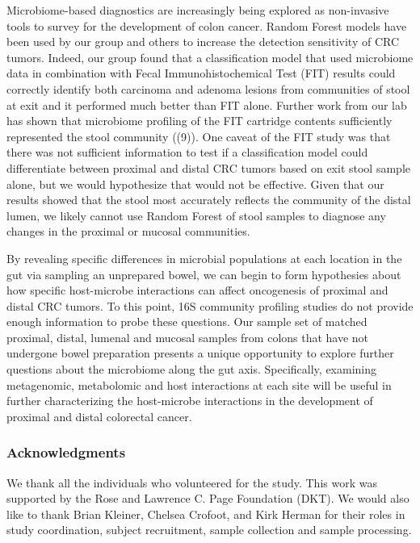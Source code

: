 \documentclass[11pt,]{article}
\begin{document}
Microbiome-based diagnostics are increasingly being explored as
non-invasive tools to survey for the development of colon cancer. Random
Forest models have been used by our group and others to increase the
detection sensitivity of CRC tumors. Indeed, our group found that a
classification model that used microbiome data in combination with Fecal
Immunohistochemical Test (FIT) results could correctly identify both
carcinoma and adenoma lesions from communities of stool at exit and it
performed much better than FIT alone. Further work from our lab has
shown that microbiome profiling of the FIT cartridge contents
sufficiently represented the stool community ((9)). One caveat of the
FIT study was that there was not sufficient information to test if a
classification model could differentiate between proximal and distal CRC
tumors based on exit stool sample alone, but we would hypothesize that
would not be effective. Given that our results showed that the stool
most accurately reflects the community of the distal lumen, we likely
cannot use Random Forest of stool samples to diagnose any changes in the
proximal or mucosal communities.

By revealing specific differences in microbial populations at each
location in the gut via sampling an unprepared bowel, we can begin to
form hypothesies about how specific host-microbe interactions can affect
oncogenesis of proximal and distal CRC tumors. To this point, 16S
community profiling studies do not provide enough information to probe
these questions. Our sample set of matched proximal, distal, lumenal and
mucosal samples from colons that have not undergone bowel preparation
presents a unique opportunity to explore further questions about the
microbiome along the gut axis. Specifically, examining metagenomic,
metabolomic and host interactions at each site will be useful in further
characterizing the host-microbe interactions in the development of
proximal and distal colorectal cancer.

\subsubsection{Acknowledgments}\label{acknowledgments}

We thank all the individuals who volunteered for the study. This work
was supported by the Rose and Lawrence C. Page Foundation (DKT). We
would also like to thank Brian Kleiner, Chelsea Crofoot, and Kirk Herman
for their roles in study coordination, subject recruitment, sample
collection and sample processing.
\end{document}
